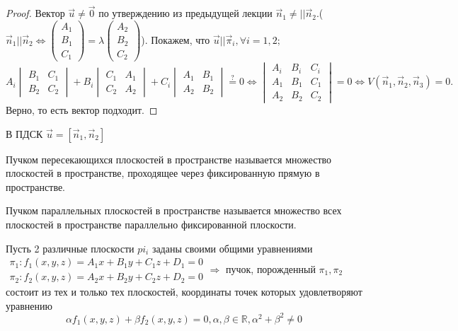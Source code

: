 \begin{proof}
	Вектор \(\vec u \ne \vec 0\) по утверждению из предыдущей лекции \(\vec n_1 \ne||\vec n_2\).(\(\vec n_1 || \vec n_2\Longleftrightarrow \begin{pmatrix}
		A_1 \\ B_1 \\ C_1
	\end{pmatrix}= \lambda \begin{pmatrix}
	A_2 \\ B_2 \\ C_2
	\end{pmatrix}\)). Покажем, что \(\vec u || \vec \pi_i, \forall i = 1, 2;\)\newline
	\(A_i\begin{vmatrix}
		B_1 & C_1 \\ B_2 & C_2
	\end{vmatrix}+ B_i
	\begin{vmatrix}
		C_1 & A_1 \\ C_2 & A_2
	\end{vmatrix}+C_i\begin{vmatrix}
	A_1 & B_1 \\ A_2 & B_2
	\end{vmatrix}\overset{?}{=} 0 \Longleftrightarrow \begin{vmatrix}
	A_i & B_i & C_i \\ A_1 & B_1 & C_1 \\ A_2 & B_2 & C_2
	\end{vmatrix} = 0\Longleftrightarrow V(\vec n_1, \vec n_2, \vec n_3) = 0.\) Верно, то есть вектор подходит.
\end{proof}
\begin{note}
	В ПДСК \(\vec u = [\vec n_1, \vec n_2]\)
\end{note}

\begin{definition}
	Пучком пересекающихся плоскостей в пространстве называется множество плоскостей в пространстве, проходящее через фиксированную прямую в пространстве.
\end{definition}
\begin{definition}
	Пучком параллельных плоскостей в пространстве называется множество всех плоскостей в пространстве параллельно фиксированной плоскости.
\end{definition}
\begin{theorem}
	Пусть 2 различные плоскости \(pi_i\) заданы своими общими уравнениями\newline
	\(\begin{gathered}
		\pi_1: f_1(x,y,z) = A_1x+B_1y+C_1z+D_1 = 0\\
		\pi_2: f_2(x,y,z) = A_2x+B_2y+C_2z+D_2 = 0
	\end{gathered}\Longrightarrow\) пучок, порожденный \(\pi_1, \pi_2\) состоит из тех и только тех плоскостей, координаты точек которых удовлетворяют уравнению
	\begin{equation}\label{1}
		\alpha f_1(x,y,z)+\beta f_2(x,y,z) = 0, \alpha, \beta \in \mathbb{R}, \alpha^2+\beta^2\ne0
	\end{equation}
\end{theorem}


